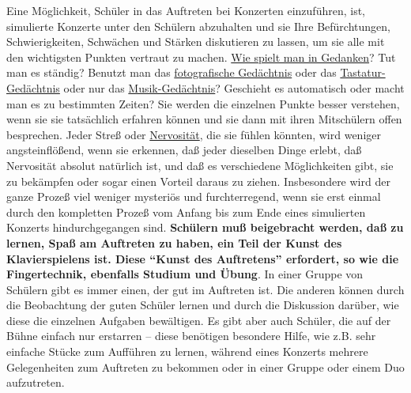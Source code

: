 Eine Möglichkeit, Schüler in das Auftreten bei Konzerten einzuführen, ist, simulierte Konzerte unter den Schülern abzuhalten und sie Ihre Befürchtungen, Schwierigkeiten, Schwächen und Stärken diskutieren zu lassen, um sie alle mit den wichtigsten Punkten vertraut zu machen.
\hyperref[c1ii12mental]{Wie spielt man in Gedanken}?
Tut man es ständig?
Benutzt man das \hyperref[c1iii6foto]{fotografische Gedächtnis} oder das \hyperref[c1iii6tastatur]{Tastatur-Gedächtnis} oder nur das \hyperref[c1iii6musik]{Musik-Gedächtnis}?
Geschieht es automatisch oder macht man es zu bestimmten Zeiten?
Sie werden die einzelnen Punkte besser verstehen, wenn sie sie tatsächlich erfahren können und sie dann mit ihren Mitschülern offen besprechen.
Jeder Streß oder \hyperref[c1iii15]{Nervosität}, die sie fühlen könnten, wird weniger angsteinflößend, wenn sie erkennen, daß jeder dieselben Dinge erlebt, daß Nervosität absolut natürlich ist, und daß es verschiedene Möglichkeiten gibt, sie zu bekämpfen oder sogar einen Vorteil daraus zu ziehen.
Insbesondere wird der ganze Prozeß viel weniger mysteriös und furchterregend, wenn sie erst einmal durch den kompletten Prozeß vom Anfang bis zum Ende eines simulierten Konzerts hindurchgegangen sind.
\textbf{Schülern muß beigebracht werden, daß zu lernen, Spaß am Auftreten zu haben, ein Teil der Kunst des Klavierspielens ist.
Diese \enquote{Kunst des Auftretens} erfordert, so wie die Fingertechnik, ebenfalls Studium und Übung}.
In einer Gruppe von Schülern gibt es immer einen, der gut im Auftreten ist.
Die anderen können durch die Beobachtung der guten Schüler lernen und durch die Diskussion darüber, wie diese die einzelnen Aufgaben bewältigen.
Es gibt aber auch Schüler, die auf der Bühne einfach nur erstarren -- diese benötigen besondere Hilfe, wie z.B. sehr einfache Stücke zum Aufführen zu lernen, während eines Konzerts mehrere Gelegenheiten zum Auftreten zu bekommen oder in einer Gruppe oder einem Duo aufzutreten.

